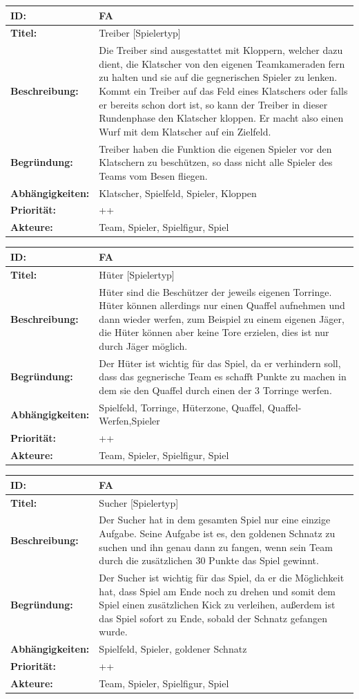 \documentclass[a4paper,12pt,
headsepline,           %
oneside,               %
pointlessnumbers,      %
bibtotoc,              %
]{scrartcl}
\newcommand{\anf}[7] {
    \begin{table}[H]
        \centering
        \begin{tabular}{|p{3.2cm}|p{11.3cm}|}
        	\hline
            \textbf{ID:} & \textbf{#1} \\ \hline
            \textbf{Titel:} & #2 \\ \hline
            \textbf{Beschreibung:} & #3 \\ \hline
            \textbf{Begründung:} & #4 \\ \hline
            \textbf{Abhängigkeiten:} & #5 \\ \hline
            \textbf{Priorität:} & #6 \\ \hline
            \textbf{Akteure:} & #7 \\ \hline
        \end{tabular}
    \end{table}
}
\newcounter{fanfCount}
\newcommand{\fanf}[6] {
    \stepcounter{fanfCount}
    \anf{FA\thefanfCount}{#1}{#2}{#3}{#4}{#5}{#6}
}
\begin{document}
	\fanf	{Treiber [Spielertyp]}
			{Die Treiber sind ausgestattet mit Kloppern, welcher dazu dient, die Klatscher von den eigenen Teamkameraden fern zu halten und sie auf die gegnerischen Spieler zu lenken. Kommt ein Treiber auf das Feld eines Klatschers oder falls er bereits schon dort ist, so kann der Treiber in dieser Rundenphase den Klatscher kloppen. Er macht also einen Wurf mit dem Klatscher auf ein Zielfeld.}
			{Treiber haben die Funktion die eigenen Spieler vor den Klatschern zu beschützen, so dass nicht alle Spieler des Teams vom Besen fliegen.}
			{Klatscher, Spielfeld, Spieler, Kloppen}
			{++}
			{Team, Spieler, Spielfigur, Spiel}
	
	\fanf	{Hüter [Spielertyp]}
			{Hüter sind die Beschützer der jeweils eigenen Torringe. Hüter können allerdings nur einen Quaffel aufnehmen und dann wieder werfen, zum Beispiel zu einem eigenen Jäger, die Hüter können aber keine Tore erzielen, dies ist nur durch Jäger möglich.}
			{Der Hüter ist wichtig für das Spiel, da er verhindern soll, dass das gegnerische Team es schafft Punkte zu machen in dem sie den Quaffel durch einen der 3 Torringe werfen.}
			{Spielfeld, Torringe, Hüterzone, Quaffel, Quaffel-Werfen,Spieler}
			{++}
			{Team, Spieler, Spielfigur, Spiel}
	
	\fanf	{Sucher [Spielertyp]}
			{Der Sucher hat in dem gesamten Spiel nur eine einzige Aufgabe. Seine Aufgabe ist es, den goldenen Schnatz zu suchen und ihn genau dann zu fangen, wenn sein Team durch die zusätzlichen 30 Punkte das Spiel gewinnt.}
			{Der Sucher ist wichtig für das Spiel, da er die Möglichkeit hat, dass Spiel am Ende noch zu drehen und somit dem Spiel einen zusätzlichen Kick zu verleihen, außerdem ist das Spiel sofort zu Ende, sobald der Schnatz gefangen wurde.}
			{Spielfeld, Spieler, goldener Schnatz}
			{++}
			{Team, Spieler, Spielfigur, Spiel}
			
\end{document}
